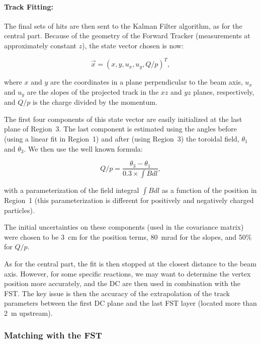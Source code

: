 \paragraph{Track Fitting:}

The final sets of hits are then sent to the Kalman Filter algorithm, as for the 
central part.  Because of the geometry of the Forward Tracker (measurements at 
approximately constant $z$), the state vector chosen is now:

\begin{equation}
\vec{x} = (x, y, u_x, u_y, Q/p)^T,
\end{equation}

\noindent
where $x$ and $y$ are the coordinates in a plane perpendicular to the beam axis, 
$u_x$ and $u_y$ are the slopes of the projected track in the $xz$ and $yz$ planes, 
respectively, and $Q/p$ is the charge divided by the momentum.

The first four components of this state vector are easily initialized at the last 
plane of Region~3.  The last component is estimated using the angles before (using a 
linear fit in Region~1) and after (using Region~3) the toroidal field, $\theta_1$ 
and $\theta_3$.  We then use the well known formula:

\begin{equation}
Q/p = \frac{\theta_3-\theta_1}{0.3\times \int{Bdl}},
\end{equation}

\noindent
with a parameterization of the field integral $\int{Bdl}$ as a function of the 
position in Region~1 (this parameterization is different for positively and negatively
charged particles).

The initial uncertainties on these components (used in the covariance matrix) were 
chosen to be 3~cm for the position terms, 80~mrad for the slopes, and 50\% for $Q/p$.

As for the central part, the fit is then stopped at the closest distance to the beam 
axis.  However, for some specific reactions, we may want to determine the vertex 
position more accurately, and the DC are then used in combination with the FST.  The 
key issue is then the accuracy of the extrapolation of the track parameters between 
the first DC plane and the last FST layer (located more than 2~m upstream).

\subsubsection{Matching with the FST}

